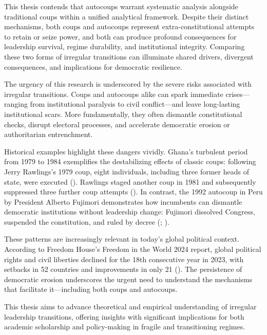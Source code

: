 \documentclass[
  12pt,
]{report}
\begin{document}
This thesis contends that autocoups warrant systematic analysis
alongside traditional coups within a unified analytical framework.
Despite their distinct mechanisms, both coups and autocoups represent
extra-constitutional attempts to retain or seize power, and both can
produce profound consequences for leadership survival, regime
durability, and institutional integrity. Comparing these two forms of
irregular transitions can illuminate shared drivers, divergent
consequences, and implications for democratic resilience.

The urgency of this research is underscored by the severe risks
associated with irregular transitions. Coups and autocoups alike can
spark immediate crises---ranging from institutional paralysis to civil
conflict---and leave long-lasting institutional scars. More
fundamentally, they often dismantle constitutional checks, disrupt
electoral processes, and accelerate democratic erosion or authoritarian
entrenchment.

Historical examples highlight these dangers vividly. Ghana's turbulent
period from 1979 to 1984 exemplifies the destabilizing effects of
classic coups: following Jerry Rawlings's 1979 coup, eight individuals,
including three former heads of state, were executed
(). Rawlings staged another
coup in 1981 and subsequently suppressed three further coup attempts
(). In contrast, the 1992
autocoup in Peru by President Alberto Fujimori demonstrates how
incumbents can dismantle democratic institutions without leadership
change: Fujimori dissolved Congress, suspended the constitution, and
ruled by decree (;
).

These patterns are increasingly relevant in today's global political
context. According to Freedom House's Freedom in the World 2024 report,
global political rights and civil liberties declined for the 18th
consecutive year in 2023, with setbacks in 52 countries and improvements
in only 21 ().
The persistence of democratic erosion underscores the urgent need to
understand the mechanisms that facilitate it---including both coups and
autocoups.

This thesis aims to advance theoretical and empirical understanding of
irregular leadership transitions, offering insights with significant
implications for both academic scholarship and policy-making in fragile
and transitioning regimes.
\end{document}
